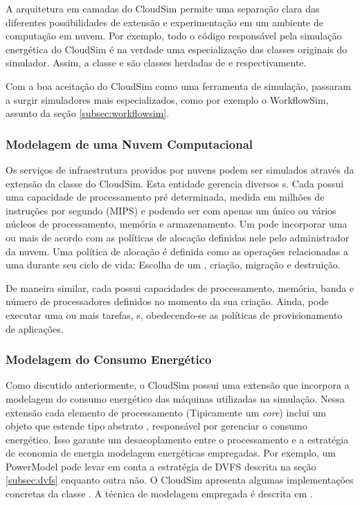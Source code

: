A arquitetura em camadas do CloudSim permite uma separação clara das diferentes
possibilidades de extensão e experimentação em um ambiente de computação em nuvem.
Por exemplo, todo o código responsável pela simulação energética do CloudSim
é na verdade uma especialização das classes originais do simulador. Assim,
a classe  e  são classes herdadas de
 e  respectivamente.

Com a boa aceitação do CloudSim como uma ferramenta de simulação, passaram a 
surgir simuladores mais especializados, como por exemplo o WorkflowSim, assunto
da seção \ref{subsec:workflowsim}.

\subsubsection{Modelagem de uma Nuvem Computacional}

Os serviços de infraestrutura providos por nuvens podem ser simulados através 
da extensão da classe  do CloudSim. Esta entidade gerencia
diversos s. Cada  possui uma capacidade de processamento 
pré determinada, medida em milhões de instruções por segundo (MIPS) e podendo 
ser com apenas um único ou vários núcleos de processamento, memória e
armazenamento. Um  pode incorporar uma ou mais 
de acordo com as políticas de alocação definidas nele pelo administrador da nuvem.
Uma política de alocação é definida como as operações relacionadas a uma
 durante seu ciclo de vida: Escolha de um , criação, 
migração e destruição.

De maneira similar, cada  possui capacidades de processamento, memória,
banda e número de processadores definidos no momento da sua criação. Ainda,
pode executar uma ou mais tarefas, s, obedecendo-se as políticas
de provisionamento de aplicações.

\subsubsection{Modelagem do Consumo Energético}
Como discutido anteriormente, o CloudSim possui uma extensão que incorpora 
a modelagem do consumo energético das máquinas utilizadas na simulação. Nessa 
extensão cada elemento de processamento (Tipicamente um \emph{core}) inclui um
objeto que estende tipo abstrato , responsável por gerenciar o
consumo energético. Isso garante um desacoplamento entre o processamento e 
a estratégia de economia de energia modelagem energéticas empregadas. Por exemplo,
um PowerModel pode levar em conta a estratégia de DVFS descrita na seção 
\ref{subsec:dvfs} enquanto outra não. O CloudSim apresenta algumas implementações
concretas da classe . A técnica de modelagem empregada é descrita
em \cite{beloglazov:cloudsim_power}.


